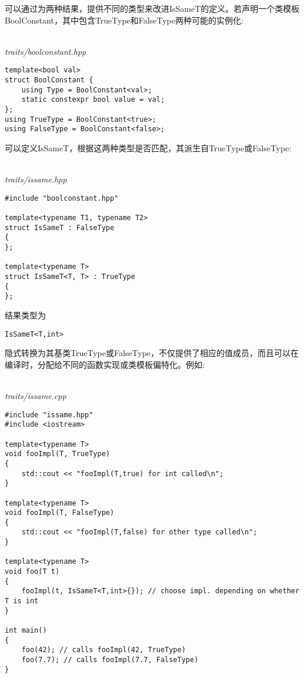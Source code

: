 可以通过为两种结果，提供不同的类型来改进IsSameT的定义。若声明一个类模板BoolConstant，其中包含TrueType和FalseType两种可能的实例化:

\hspace*{\fill} \\ %
\noindent
\textit{traits/boolconstant.hpp}
\begin{lstlisting}[style=styleCXX]
template<bool val>
struct BoolConstant {
	using Type = BoolConstant<val>;
	static constexpr bool value = val;
};
using TrueType = BoolConstant<true>;
using FalseType = BoolConstant<false>;
\end{lstlisting}

可以定义IsSameT，根据这两种类型是否匹配，其派生自TrueType或FalseType:

\hspace*{\fill} \\ %
\noindent
\textit{traits/issame.hpp}
\begin{lstlisting}[style=styleCXX]
#include "boolconstant.hpp"

template<typename T1, typename T2>
struct IsSameT : FalseType
{
};

template<typename T>
struct IsSameT<T, T> : TrueType
{
};
\end{lstlisting}

结果类型为

\begin{lstlisting}[style=styleCXX]
IsSameT<T,int>
\end{lstlisting}

隐式转换为其基类TrueType或FalseType，不仅提供了相应的值成员，而且可以在编译时，分配给不同的函数实现或类模板偏特化。例如:

\hspace*{\fill} \\ %
\noindent
\textit{traits/issame.cpp}
\begin{lstlisting}[style=styleCXX]
#include "issame.hpp"
#include <iostream>

template<typename T>
void fooImpl(T, TrueType)
{
	std::cout << "fooImpl(T,true) for int called\n";
}

template<typename T>
void fooImpl(T, FalseType)
{
	std::cout << "fooImpl(T,false) for other type called\n";
}

template<typename T>
void foo(T t)
{
	fooImpl(t, IsSameT<T,int>{}); // choose impl. depending on whether T is int
}

int main()
{
	foo(42); // calls fooImpl(42, TrueType)
	foo(7.7); // calls fooImpl(7.7, FalseType)
}
\end{lstlisting}


